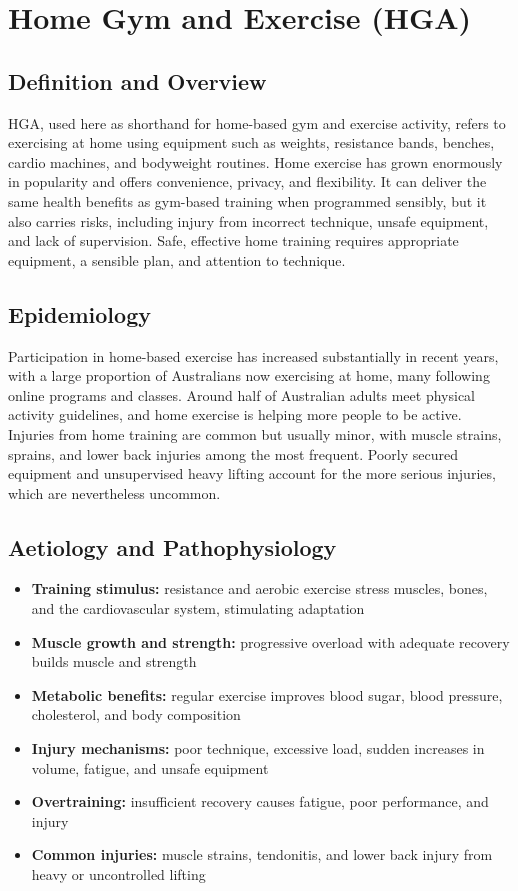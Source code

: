 \chapter{Home Gym and Exercise (HGA)}

\section*{Definition and Overview}
HGA, used here as shorthand for home-based gym and exercise activity, refers to exercising at home using equipment such as weights, resistance bands, benches, cardio machines, and bodyweight routines. Home exercise has grown enormously in popularity and offers convenience, privacy, and flexibility. It can deliver the same health benefits as gym-based training when programmed sensibly, but it also carries risks, including injury from incorrect technique, unsafe equipment, and lack of supervision. Safe, effective home training requires appropriate equipment, a sensible plan, and attention to technique.

\section*{Epidemiology}
Participation in home-based exercise has increased substantially in recent years, with a large proportion of Australians now exercising at home, many following online programs and classes. Around half of Australian adults meet physical activity guidelines, and home exercise is helping more people to be active. Injuries from home training are common but usually minor, with muscle strains, sprains, and lower back injuries among the most frequent. Poorly secured equipment and unsupervised heavy lifting account for the more serious injuries, which are nevertheless uncommon.

\section*{Aetiology and Pathophysiology}
\begin{itemize}
    \item \textbf{Training stimulus:} resistance and aerobic exercise stress muscles, bones, and the cardiovascular system, stimulating adaptation
    \item \textbf{Muscle growth and strength:} progressive overload with adequate recovery builds muscle and strength
    \item \textbf{Metabolic benefits:} regular exercise improves blood sugar, blood pressure, cholesterol, and body composition
    \item \textbf{Injury mechanisms:} poor technique, excessive load, sudden increases in volume, fatigue, and unsafe equipment
    \item \textbf{Overtraining:} insufficient recovery causes fatigue, poor performance, and injury
    \item \textbf{Common injuries:} muscle strains, tendonitis, and lower back injury from heavy or uncontrolled lifting
\end{itemize}

